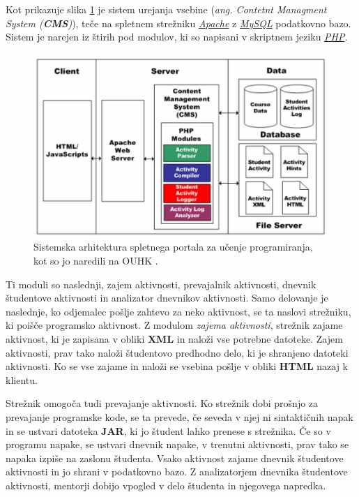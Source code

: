 Kot prikazuje slika \ref{fig:OUHK_cmsArch} je sistem urejanja vsebine
(\emph{ang. Contetnt Managment System (\textbf{CMS})}), teče na
spletnem strežniku \emph{\href{http://www.apache.org/}{Apache}} z
\emph{\href{https://www.mysql.com/}{MySQL}} podatkovno bazo. Sistem je
narejen iz štirih pod modulov, ki so napisani v skriptnem jeziku
\emph{\href{http://php.net/}{PHP}}.

\begin{figure}[htb!] \centering
  \includegraphics[width=0.9\linewidth, keepaspectratio =
1]{./images/SystemArch01_OUHK_DistanceEdu.jpg}
  \caption{Sistemska arhitektura spletnega portala za učenje
    programiranja, kot so jo naredili na OUHK \cite{ITaLCP_DistanceEdu}.}
  \label{fig:OUHK_cmsArch}
\end{figure}

Ti moduli so naslednji, zajem aktivnosti, prevajalnik aktivnosti,
dnevnik študentove aktivnosti in analizator dnevnikov aktivnosti. Samo
delovanje je naslednje, ko odjemalec pošlje zahtevo za neko aktivnost,
se ta naslovi strežniku, ki poišče programsko aktivnost. Z modulom
\emph{zajema aktivnosti}, strežnik zajame aktivnost, ki je zapisana v
obliki \textbf{XML} in naloži vse potrebne datoteke. Zajem aktivnosti,
prav tako naloži študentovo predhodno delo, ki je shranjeno datoteki
aktivnosti. Ko se vse zajame in naloži se vsebina pošlje v obliki
\textbf{HTML} nazaj k klientu.

Strežnik omogoča tudi prevajanje aktivnosti. Ko strežnik dobi prošnjo
za prevajanje programske kode, se ta prevede, če seveda v njej ni
sintaktičnih napak in se ustvari datoteka \textbf{JAR}, ki jo študent
lahko prenese s strežnika. Če so v programu napake, se ustvari dnevnik
napake, v trenutni aktivnosti, prav tako se napaka izpiše na zaslonu
študenta. Vsako aktivnost zajame dnevnik študentove aktivnosti in jo shrani v
podatkovno bazo. Z analizatorjem dnevnika študentove aktivnosti,
mentorji dobijo vpogled v delo študenta in njegovega napredka.

